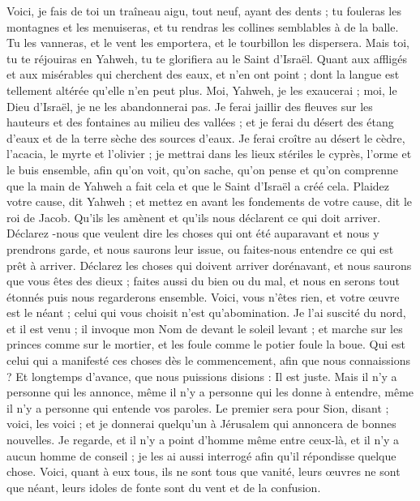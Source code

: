 \begin{multicols}{2}
Voici, je fais de toi un traîneau aigu, tout neuf, ayant des dents ; tu fouleras les montagnes et les menuiseras, et tu rendras les collines semblables à de la balle.
Tu les vanneras, et le vent les emportera, et le tourbillon les dispersera. Mais toi, tu te réjouiras en Yahweh, tu te glorifiera au le Saint d'Israël.
Quant aux affligés et aux misérables qui cherchent des eaux, et n'en ont point ; dont la langue est tellement altérée qu'elle n'en peut plus. Moi, Yahweh, je les exaucerai ; moi, le Dieu d'Israël, je ne les abandonnerai pas.
Je ferai jaillir des fleuves sur les hauteurs et des fontaines au milieu des vallées ; et je ferai du désert des étang d'eaux et de la terre sèche des sources d'eaux.
Je ferai croître au désert le cèdre, l'acacia, le myrte et l'olivier ; je mettrai dans les lieux stériles le cyprès, l'orme et le buis ensemble,
afin qu'on voit, qu'on sache, qu'on pense et qu'on comprenne que la main de Yahweh a fait cela et que le Saint d'Israël a créé cela.
Plaidez votre cause, dit Yahweh ; et mettez en avant les fondements de votre cause, dit le roi de Jacob.
Qu'ils les amènent et qu'ils nous déclarent ce qui doit arriver. Déclarez 
-nous que veulent dire les choses qui ont été auparavant et nous y prendrons garde, et nous saurons leur issue, ou faites-nous entendre ce qui est prêt à arriver. 
Déclarez les choses qui doivent arriver dorénavant, et nous saurons que vous êtes des dieux ; faites aussi du bien ou du mal, et nous en serons tout étonnés puis nous regarderons ensemble.
Voici, vous n'êtes rien, et votre œuvre est le néant ; celui qui vous choisit n'est qu'abomination.
Je l'ai suscité du nord, et il est venu ; il invoque mon Nom de devant le soleil levant ; et marche sur les princes comme sur le mortier, et les foule comme le potier foule la boue.
Qui est celui qui a manifesté ces choses dès le commencement, afin que nous connaissions ? Et longtemps d'avance, que nous puissions disions : Il est juste. Mais il n'y a personne qui les annonce, même il n'y a personne qui les donne à entendre, même il n'y a personne qui entende vos paroles.
Le premier sera pour Sion, disant ; voici, les voici ; et je donnerai quelqu'un à Jérusalem qui annoncera de bonnes nouvelles.
Je regarde, et il n'y a point d'homme même entre ceux-là, et il n'y a aucun homme de conseil ; je les ai aussi interrogé afin qu'il répondisse quelque chose. 
Voici, quant à eux tous, ils ne sont tous que vanité, leurs œuvres ne sont que néant, leurs idoles de fonte sont du vent et de la confusion.

\end{multicols}

